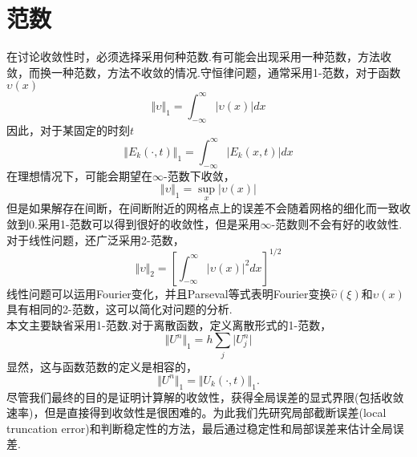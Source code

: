 \section{范数}
在讨论收敛性时，必须选择采用何种范数.有可能会出现采用一种范数，方法收敛，而换一种范数，方法不收敛的情况.守恒律问题，通常采用1-范数，对于函数$\upsilon(x)$
\begin{equation}
	\Vert \upsilon \Vert_1 = \int_{-\infty}^{\infty} \lvert \upsilon(x) \rvert dx
\end{equation}
因此，对于某固定的时刻$t$
\begin{equation}
\Vert E_k(\cdot,t) \Vert_1 = \int_{-\infty}^{\infty} \lvert E_k(x,t) \rvert dx
\end{equation}
在理想情况下，可能会期望在$\infty$-范数下收敛，
\begin{equation}
	\Vert \upsilon \Vert_1 = \sup_x \lvert \upsilon(x) \rvert 
\end{equation}
但是如果解存在间断，在间断附近的网格点上的误差不会随着网格的细化而一致收敛到0.采用1-范数可以得到很好的收敛性，但是采用$\infty$-范数则不会有好的收敛性.\\
对于线性问题，还广泛采用2-范数，
\begin{equation}
	\Vert \upsilon \Vert_2 = \left[ \int_{-\infty}^{\infty} \lvert \upsilon(x)\rvert^2 dx \right]^{1/2} 
\end{equation}
线性问题可以运用Fourier变化，并且Parseval等式表明Fourier变换$\hat{\upsilon}(\xi)$和$\upsilon(x)$具有相同的2-范数，这可以简化对问题的分析.\\
本文主要缺省采用1-范数.对于离散函数，定义离散形式的1-范数，
\begin{equation}
	\Vert U^n \Vert_1 = h \sum_j \lvert U_j^n \rvert 
\end{equation}
显然，这与函数范数的定义是相容的，
\begin{equation}
	\Vert U^n \Vert_1 = \Vert U_k(\cdot,t) \Vert_1.
\end{equation}
尽管我们最终的目的是证明计算解的收敛性，获得全局误差的显式界限(包括收敛速率)，但是直接得到收敛性是很困难的。为此我们先研究局部截断误差(local truncation error)和判断稳定性的方法，最后通过稳定性和局部误差来估计全局误差.

